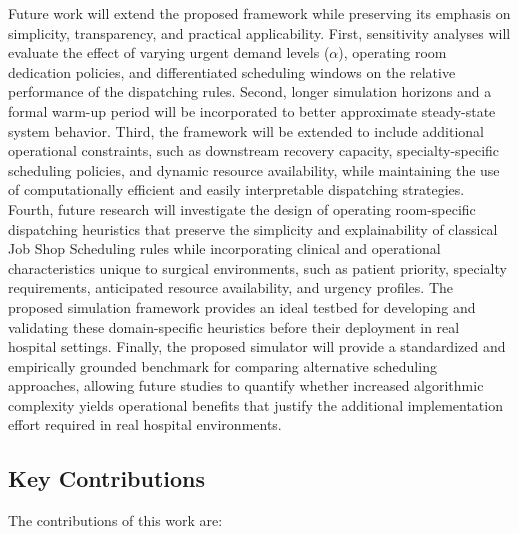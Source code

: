 \documentclass[sn-mathphys-num]{sn-jnl}
\begin{document}
    Future work will extend the proposed framework while preserving its emphasis on simplicity, transparency, and practical applicability. First, sensitivity analyses will evaluate the effect of varying urgent demand levels ($\alpha$), operating room dedication policies, and differentiated scheduling windows on the relative performance of the dispatching rules. Second, longer simulation horizons and a formal warm-up period will be incorporated to better approximate steady-state system behavior. Third, the framework will be extended to include additional operational constraints, such as downstream recovery capacity, specialty-specific scheduling policies, and dynamic resource availability, while maintaining the use of computationally efficient and easily interpretable dispatching strategies. Fourth, future research will investigate the design of operating room-specific dispatching heuristics that preserve the simplicity and explainability of classical Job Shop Scheduling rules while incorporating clinical and operational characteristics unique to surgical environments, such as patient priority, specialty requirements, anticipated resource availability, and urgency profiles. The proposed simulation framework provides an ideal testbed for developing and validating these domain-specific heuristics before their deployment in real hospital settings. Finally, the proposed simulator will provide a standardized and empirically grounded benchmark for comparing alternative scheduling approaches, allowing future studies to quantify whether increased algorithmic complexity yields operational benefits that justify the additional implementation effort required in real hospital environments.
    

\subsection{Key Contributions}

The contributions of this work are:
\end{document}
